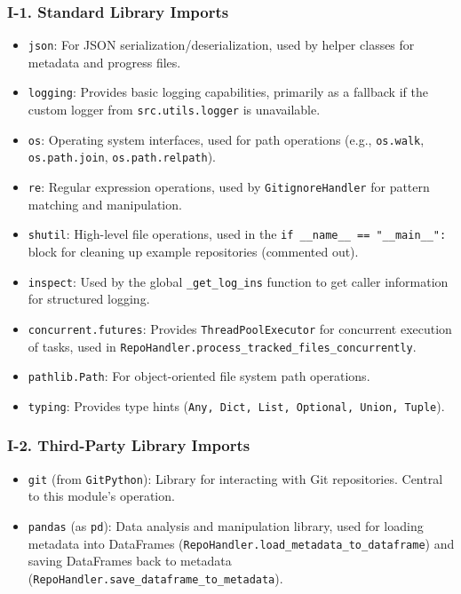 \documentclass{article}
\begin{document}
\subsubsection{I-1. Standard Library Imports}
\begin{itemize}
    \item \texttt{json}: For JSON serialization/deserialization, used by helper classes for metadata and progress files.
    \item \texttt{logging}: Provides basic logging capabilities, primarily as a fallback if the custom logger from \texttt{src.utils.logger} is unavailable.
    \item \texttt{os}: Operating system interfaces, used for path operations (e.g., \texttt{os.walk}, \texttt{os.path.join}, \texttt{os.path.relpath}).
    \item \texttt{re}: Regular expression operations, used by \texttt{GitignoreHandler} for pattern matching and manipulation.
    \item \texttt{shutil}: High-level file operations, used in the \texttt{if \_\_name\_\_ == "\_\_main\_\_":} block for cleaning up example repositories (commented out).
    \item \texttt{inspect}: Used by the global \texttt{\_get\_log\_ins} function to get caller information for structured logging.
    \item \texttt{concurrent.futures}: Provides \texttt{ThreadPoolExecutor} for concurrent execution of tasks, used in \texttt{RepoHandler.process\_tracked\_files\_concurrently}.
    \item \texttt{pathlib.Path}: For object-oriented file system path operations.
    \item \texttt{typing}: Provides type hints (\texttt{Any, Dict, List, Optional, Union, Tuple}).
\end{itemize}
\subsubsection{I-2. Third-Party Library Imports}
\begin{itemize}
    \item \texttt{git} (from \texttt{GitPython}): Library for interacting with Git repositories. Central to this module's operation.
    \item \texttt{pandas} (as \texttt{pd}): Data analysis and manipulation library, used for loading metadata into DataFrames (\texttt{RepoHandler.load\_metadata\_to\_dataframe}) and saving DataFrames back to metadata (\texttt{RepoHandler.save\_dataframe\_to\_metadata}).
\end{itemize}
\end{document}
